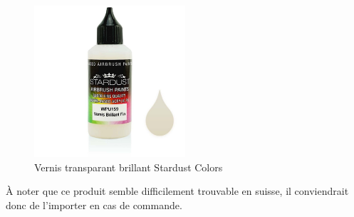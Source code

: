 \begin{figure}[H]
    \centering
    \includegraphics[width=0.5\textwidth]{assets/figures/etat_art/Stardust_vernis.jpg}
    \caption[Vernis transparant brillant Stardust Colors]{Vernis transparant brillant Stardust Colors\cite{Bouteille_vernis_stardust}}
\end{figure}
À noter que ce produit semble difficilement trouvable en suisse, il conviendrait donc de l'importer en cas de commande.
\begin{table}[H]
    \centering
    \caption{Résumé des avantages et inconvénients du vernis Stardust}
    \label{tab:Stardust_vernis}
\end{table}
\newpage
